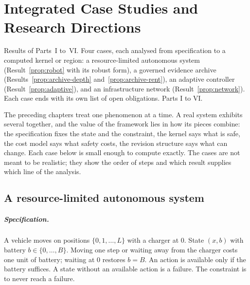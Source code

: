 \chapter{Integrated Case Studies and Research Directions}\label{ch:cases}
{Results of Parts~I to~VI.}
{Four cases, each analysed from specification to a computed kernel or region: a resource-limited autonomous system (Result~\ref{prop:robot} with its robust form), a governed evidence archive (Results~\ref{prop:archive-depth} and~\ref{prop:archive-rent}), an adaptive controller (Result~\ref{prop:adaptive}), and an infrastructure network (Result~\ref{prop:network}).}
{Each case ends with its own list of open obligations.}
{Parts I to VI.}

The preceding chapters treat one phenomenon at a time. A real system exhibits several together, and the value of the framework lies in how its pieces combine: the specification fixes the state and the constraint, the kernel says what is safe, the cost model says what safety costs, the revision structure says what can change. Each case below is small enough to compute exactly. The cases are not meant to be realistic; they show the order of steps and which result supplies which line of the analysis.

\section{A resource-limited autonomous system}

\paragraph{Specification.} A vehicle moves on positions $\{0,1,\dots,L\}$ with a charger at $0$. State $(x,b)$ with battery $b\in\{0,\dots,B\}$. Moving one step or waiting away from the charger costs one unit of battery; waiting at $0$ restores $b=B$. An action is available only if the battery suffices. A state without an available action is a failure. The constraint is to never reach a failure.

